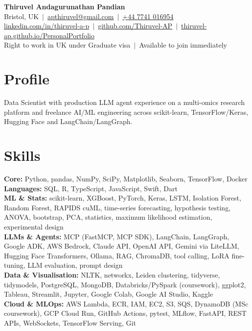 \documentclass[a4paper,11pt]{article}
\begin{document}
\fontsize{11}{13.2}\selectfont

\begin{center}
  {\LARGE\bfseries Thiruvel Andagurunathan Pandian}\\[3pt]
  Bristol, UK \,$|$\, \href{mailto:apthiruvel@gmail.com}{apthiruvel@gmail.com} \,$|$\, \href{tel:+447741016954}{+44 7741 016954}\\[1pt]
\href{https://www.linkedin.com/in/thiruvel-a-p/}{linkedin.com/in/thiruvel-a-p} \,$|$\, \href{https://github.com/Thiruvel-AP}{github.com/Thiruvel-AP} \,$|$\, \href{https://thiruvel-ap.github.io/PersonalPortfolio/}{thiruvel-ap.github.io/PersonalPortfolio}\\[1pt]
  Right to work in UK under Graduate visa \,$|$\, Available to join immediately
\end{center}

\section{Profile}
Data Scientist with production LLM agent experience on a multi-omics research platform and freelance AI/ML engineering across scikit-learn, TensorFlow/Keras, Hugging Face and LangChain/LangGraph.

\section{Skills}
\textbf{Core:} Python, pandas, NumPy, SciPy, Matplotlib, Seaborn, TensorFlow, Docker\\[2pt]
\textbf{Languages:} SQL, R, TypeScript, JavaScript, Swift, Dart\\[2pt]
\textbf{ML \& Stats:} scikit-learn, XGBoost, PyTorch, Keras, LSTM, Isolation Forest, Random Forest, RAPIDS cuML, time-series forecasting, hypothesis testing, ANOVA, bootstrap, PCA, statistics, maximum likelihood estimation, experimental design\\[2pt]
\textbf{LLMs \& Agents:} MCP (FastMCP, MCP SDK), LangChain, LangGraph, Google ADK, AWS Bedrock, Claude API, OpenAI API, Gemini via LiteLLM, Hugging Face Transformers, Ollama, RAG, ChromaDB, tool calling, LoRA fine-tuning, LLM evaluation, prompt design\\[2pt]
\textbf{Data \& Visualisation:} NLTK, networkx, Leiden clustering, tidyverse, tidymodels, PostgreSQL, MongoDB, Databricks/PySpark (coursework), ggplot2, Tableau, Streamlit, Jupyter, Google Colab, Google AI Studio, Kaggle\\[2pt]
\textbf{Cloud \& MLOps:} AWS Lambda, ECR, IAM, EC2, S3, SQS, DynamoDB (MSc coursework), GCP Cloud Run, GitHub Actions, pytest, MLflow, FastAPI, REST APIs, WebSockets, TensorFlow Serving, Git
\end{document}
